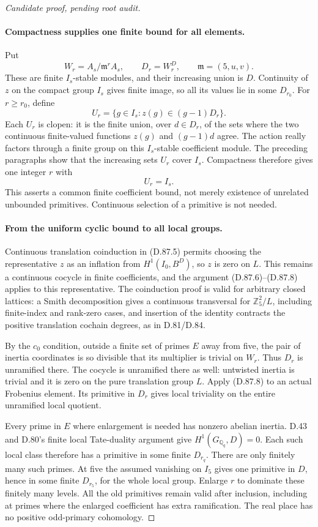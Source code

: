 \begin{proof}[Candidate proof, pending root audit]
\paragraph{Compactness supplies one finite bound for all elements.}
Put
\[
       W_r=A_s/\mathfrak m^r A_s,\qquad
       D_r=W_r^D,\qquad \mathfrak m=(5,u,v).
\]
These are finite \(I_s\)-stable modules, and their increasing
union is \(D\). Continuity of \(z\) on the compact group
\(I_s\) gives finite image, so all its values lie in some
\(D_{r_0}\). For \(r\ge r_0\), define
\[
 U_r=\{g\in I_s:z(g)\in(g-1)D_r\}.                    \tag{D.87.7}
\]
Each \(U_r\) is clopen: it is the finite union, over
\(d\in D_r\), of the sets where the two continuous
finite-valued functions \(z(g)\) and \((g-1)d\) agree.
The action really factors through a finite group on this
\(I_s\)-stable coefficient module. The preceding paragraphs
show that the increasing sets \(U_r\) cover \(I_s\).
Compactness therefore gives one integer \(r\) with
\[
                              U_r=I_s.                 \tag{D.87.8}
\]
This asserts a common finite coefficient bound, not merely
existence of unrelated unbounded primitives. Continuous
selection of a primitive is not needed.

\paragraph{From the uniform cyclic bound to all local groups.}
Continuous translation coinduction in (D.87.5) permits choosing
the representative \(z\) as an inflation from
\(H^1(I_0,B^D)\), so \(z\) is zero on \(L\).
This remains a continuous cocycle in finite coefficients,
and the argument (D.87.6)--(D.87.8) applies to this representative.
The coinduction proof is valid for arbitrary closed lattices:
a Smith decomposition gives a continuous transversal for
\(\mathbb Z_5^2/L\), including finite-index and rank-zero
cases, and insertion of the identity contracts the positive
translation cochain degrees, as in D.81/D.84.

By the \(c_0\) condition, outside a finite set of primes
\(E\) away from five, the pair of inertia coordinates is
so divisible that its multiplier is trivial on \(W_r\).
Thus \(D_r\) is unramified there. The cocycle is unramified
there as well: untwisted inertia is trivial and it is zero
on the pure translation group \(L\). Apply (D.87.8) to an
actual Frobenius element. Its primitive in \(D_r\) gives
local triviality on the entire unramified local quotient.

Every prime in \(E\) where enlargement is needed has nonzero
abelian inertia. D.43 and D.80's finite local Tate-duality
argument give \(H^1(G_{\mathbb Q_q},D)=0\). Each such local
class therefore has a primitive in some finite \(D_{r_q}\).
There are only finitely many such primes. At five the assumed
vanishing on \(I_5\) gives one primitive in \(D\), hence in
some finite \(D_{r_5}\), for the whole local group. Enlarge
\(r\) to dominate these finitely many levels. All the old
primitives remain valid after inclusion, including at primes
where the enlarged coefficient has extra ramification.
The real place has no positive odd-primary cohomology.


\end{proof}
